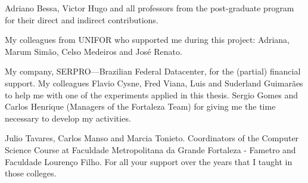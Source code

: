 Adriano Bessa, Victor Hugo and all professors from the post-graduate program for their direct and indirect contributions.

My colleagues from UNIFOR who supported me during this project: Adriana, Marum Simão, Celso Medeiros and José Renato. 

My company, SERPRO—Brazilian Federal Datacenter, for the (partial) financial support. My colleagues Flavio Cysne, Fred Viana, Luis and Suderland Guimarães to help me with one of the experiments applied in this thesis. Sergio Gomes and Carlos Henrique (Managers of the Fortaleza Team) for giving me the time necessary to develop my activities.

Julio Tavares, Carlos Manso and Marcia Tonieto. Coordinators of the Computer Science Course at
Faculdade Metropolitana da Grande Fortaleza - Fametro and Faculdade Lourenço Filho. For all your support over the years that I taught in those colleges.

